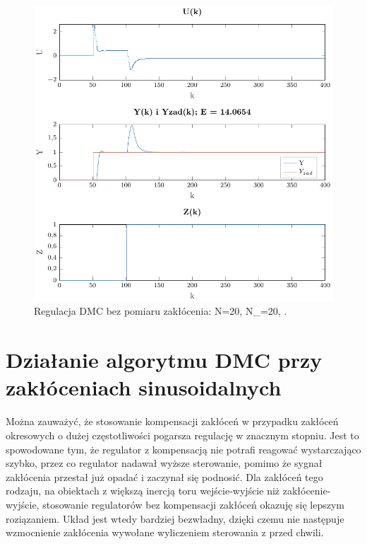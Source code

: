 \documentclass[a4paper,titlepage,11pt,twosides,floatssmall]{mwrep}
\begin{document}
\begin{figure}[H]
	\centering
	\includegraphics[scale=0.85]{../../Lab2/PDF_rysunki/Z5_DMCZZakloceniamiBezOdsprz.pdf}
	\caption{Regulacja DMC bez pomiaru zakłócenia: N=20, N_{}=20, .}
	\label{bez_pom_zak}
\end{figure}




\section{Działanie algorytmu DMC przy zakłóceniach sinusoidalnych}
Można zauważyć, że stosowanie kompensacji zakłóceń w przypadku zakłóceń okresowych o dużej częstotliwości pogarsza regulację w znacznym stopniu. Jest to spowodowane tym, że regulator z kompensacją nie potrafi reagować wystarczająco szybko, przez co regulator nadawał wyższe sterowanie, pomimo że sygnał zakłócenia przestał już opadać i zaczynał się podnosić. Dla zakłóceń tego rodzaju, na obiektach z większą inercją toru wejście-wyjście niż zakłócenie-wyjście, stosowanie regulatorów bez kompensacji zakłóceń okazuję się lepszym roziązaniem. Układ jest wtedy bardziej bezwładny, dzięki czemu nie następuje wzmocnienie zakłócenia wywołane wyliczeniem sterowania z przed chwili. 
\end{document}
